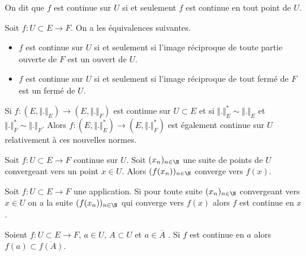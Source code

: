 \documentclass[class=report,crop=false]{standalone}
\begin{document}
\begin{definition} 
\textcolor[rgb]{0.73,0.00,0.00}{
\noindent On dit que $f$ est continue sur $U$ si et seulement $f$ est continue en tout point de $U$.
}
\end{definition}


 \begin{proposition}
\textcolor[rgb]{0.50,0.00,0.25}{
Soit $f: U \subset E \rightarrow F$. On a les équivalences suivantes.
\begin{itemize}
\item $f$ est continue sur $U$ si et seulement si l'image réciproque de toute partie ouverte de $F$ est un ouvert de $U$.
\item $f$ est continue sur $U$ si et seulement si l'image réciproque de tout
fermé de $F$ est un fermé de $U$.
\end{itemize}
}
\end{proposition}


 \begin{proposition}
\textcolor[rgb]{0.50,0.00,0.25}{
Si $f:(E, \Vert . \Vert_E) \rightarrow (E, \Vert . \Vert_F)$ est continue sur $U \subset E$ et si $\Vert . \Vert_E^*\sim \Vert . \Vert_E$ et $\Vert . \Vert_F^*\sim \Vert . \Vert_F$. Alors $f:(E, \Vert . \Vert_E^*) \rightarrow (E, \Vert . \Vert_F^*)$ est également continue sur $U$ relativement à ces nouvelles normes.
}
\end{proposition}


 \begin{proposition}
\textcolor[rgb]{0.50,0.00,0.25}{
Soit $f: U \subset E \rightarrow F$ continue sur $U$. Soit $(x_n)_{n \in \N}$ une suite de points de $U$ convergeant vers un point $x \in U$. Alors $(f(x_n))_{n \in \N}$ converge vers $f(x)$.
}
\end{proposition}

 \begin{proposition}[RECIPROQUE]
\textcolor[rgb]{0.50,0.00,0.25}{
Soit $f: U \subset E \rightarrow F$ une application.  Si pour toute suite $(x_n)_{n \in \N}$ convergeant vers $x \in U$ on a la suite  $(f(x_n))_{n \in \N}$ qui converge vers $f(x)$ alors $f$ est continue en $x$.
}
\end{proposition}

 \begin{proposition}
\textcolor[rgb]{0.50,0.00,0.25}{
Soient $f: U \subset E \rightarrow F$, $a \in U$, $A \subset U$ et $a \in \overline{A}$ . Si $f$ est continue en $a$ alors $f(a) \subset \overline{f(A)}$.
}
\end{proposition}
\end{document}
